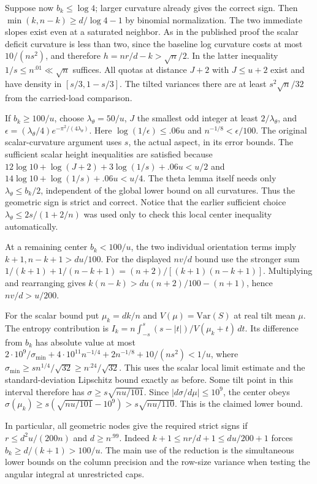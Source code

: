 \documentclass[11pt]{article}
\begin{document}
Suppose now $b_k\le\log4$; larger curvature already gives the correct sign. Then $\min(k,n-k)\ge d/\log4-1$ by binomial normalization. The two immediate slopes exist even at a saturated neighbor. As in the published proof the scalar deficit curvature is less than two, since the baseline log curvature costs at most $10/(ns^2)$, and therefore $h=nr/d-k>\sqrt n/2$. In the latter inequality $1/s\le n^{.01}\ll\sqrt n$ suffices. All quotas at distance $J+2$ with $J\le u+2$ exist and have density in $[s/3,1-s/3]$. The tilted variances there are at least $s^2\sqrt n/32$ from the carried-load comparison.

If $b_k\ge100/u$, choose $\lambda_\theta=50/u$, $J$ the smallest odd integer at least $2/\lambda_\theta$, and $\epsilon=(\lambda_\theta/4)e^{-\pi^2/(4\lambda_\theta)}$. Here $\log(1/\epsilon)\le .06u$ and $n^{-1/8}<\epsilon/100$. The original scalar-curvature argument uses $s$, the actual aspect, in its error bounds. The sufficient scalar height inequalities are satisfied because
$12\log10+\log(J+2)+3\log(1/s)+.06u < u/2$ and
$14\log10+\log(1/s)+.06u<u/4$.
The theta lemma itself needs only $\lambda_\theta\le b_k/2$, independent of the global lower bound on all curvatures. Thus the geometric sign is strict and correct. Notice that the earlier sufficient choice $\lambda_\theta\le2s/(1+2/n)$ was used only to check this local center inequality automatically.

At a remaining center $b_k<100/u$, the two individual orientation terms imply $k+1,n-k+1>du/100$. For the displayed $nv/d$ bound use the stronger sum
$1/(k+1)+1/(n-k+1)=(n+2)/[(k+1)(n-k+1)]$.
Multiplying and rearranging gives $k(n-k)>du(n+2)/100-(n+1)$, hence $nv/d>u/200$.

For the scalar bound put $\mu_k=dk/n$ and $V(\mu)=\mathrm{Var}(S)$ at real tilt mean $\mu$. The entropy contribution is $I_k=n\int_{-s}^s (s-|t|)/V(\mu_k+t)\,dt$. Its difference from $b_k$ has absolute value at most
$2\cdot10^9/\sigma_{\min}+4\cdot10^{11}n^{-1/4}+2n^{-1/8}+10/(ns^2)<1/u$,
where $\sigma_{\min}\ge s n^{1/4}/\sqrt{32}\ge n^{.24}/\sqrt{32}$. This uses the scalar local limit estimate and the standard-deviation Lipschitz bound exactly as before. Some tilt point in this interval therefore has $\sigma\ge s\sqrt{nu/101}$. Since $|d\sigma/d\mu|\le10^9$, the center obeys $\sigma(\mu_k)\ge s(\sqrt{nu/101}-10^9)>s\sqrt{nu/110}$. This is the claimed lower bound.

In particular, all geometric nodes give the required strict signs if $r\le d^2u/(200n)$ and $d\ge n^{.99}$. Indeed $k+1\le nr/d+1\le du/200+1$ forces $b_k\ge d/(k+1)>100/u$. The main use of the reduction is the simultaneous lower bounds on the column precision and the row-size variance when testing the angular integral at unrestricted caps.
\end{document}

